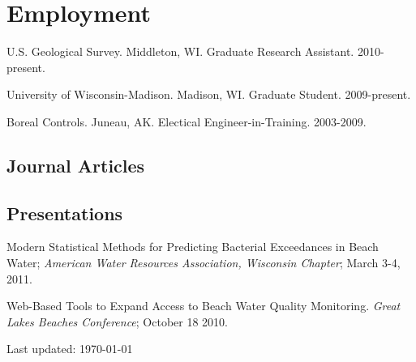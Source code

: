 \documentclass[letterpaper]{article}
\def\footerlink{}
\renewenvironment{itemize}{
  \begin{list}{}{
    \setlength{\leftmargin}{1.5em}
  }
}{
  \end{list}
}
\begin{document}
\section*{Employment}

\begin{itemize}
\item U.S. Geological Survey. Middleton, WI. Graduate Research Assistant. 2010-present.
\item University of Wisconsin-Madison. Madison, WI. Graduate Student. 2009-present.
\item Boreal Controls. Juneau, AK. Electical Engineer-in-Training. 2003-2009.
\end{itemize}


\subsection*{Journal Articles}

    
    

\subsection*{Presentations}

    
    

\begin{itemize}
\item  Modern Statistical Methods for Predicting Bacterial Exceedances in  
   Beach Water; \emph{American Water Resources Association, Wisconsin Chapter}; March 3-4, 2011.

\item Web-Based Tools to Expand Access to Beach Water Quality Monitoring. \emph{Great Lakes Beaches Conference}; October 18 2010.
\end{itemize}

\bigskip

\begin{center}
  \begin{footnotesize}
    Last updated: \today \\
    \href{\footerlink}{\texttt{\footerlink}}
  \end{footnotesize}
\end{center}

\nocite{*}
\end{document}
